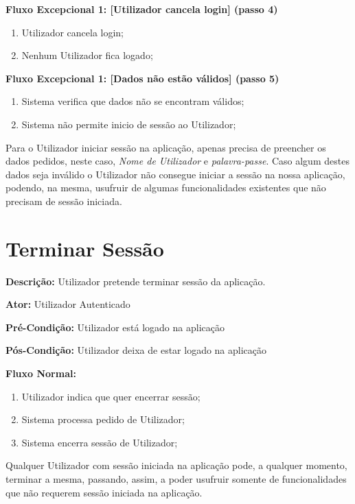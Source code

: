 \documentclass[a4paper,12pt]{scrreprt}
\newcommand{\tab}{
    \hspace{1cm}}
\begin{document}
\textbf{Fluxo Excepcional 1: [Utilizador cancela login] (passo 4)}
\begin{enumerate}[label=4.\arabic*]
    \item Utilizador cancela login;
    \item Nenhum Utilizador fica logado;
\end{enumerate}

\textbf{Fluxo Excepcional 1: [Dados não estão válidos] (passo 5)}
\begin{enumerate}[label=5.\arabic*]
    \item Sistema verifica que dados não se encontram válidos;
    \item Sistema não permite inicio de sessão ao Utilizador;
\end{enumerate}

\vspace{1.5cm}

\tab Para o Utilizador iniciar sessão na aplicação, apenas precisa de preencher os dados pedidos, neste caso, \emph{Nome de Utilizador} e \emph{palavra-passe}. Caso algum destes dados seja inválido o Utilizador não consegue iniciar a sessão na nossa aplicação, podendo, na mesma, usufruir de algumas funcionalidades existentes que não precisam de sessão iniciada.

\clearpage

\section{Terminar Sessão}

\textbf{Descrição: }Utilizador pretende terminar sessão da aplicação.

\textbf{Ator: }Utilizador Autenticado

\textbf{Pré-Condição: }Utilizador está logado na aplicação

\textbf{Pós-Condição: }Utilizador deixa de estar logado na aplicação

\textbf{Fluxo Normal: }
\begin{enumerate}
    \item Utilizador indica que quer encerrar sessão;
    \item Sistema processa pedido de Utilizador;
    \item Sistema encerra sessão de Utilizador;
\end{enumerate}

\vspace{1.5cm}

\tab Qualquer Utilizador com sessão iniciada na aplicação pode, a qualquer momento, terminar a mesma, passando, assim, a poder usufruir somente de funcionalidades que não requerem sessão iniciada na aplicação.
\end{document}
